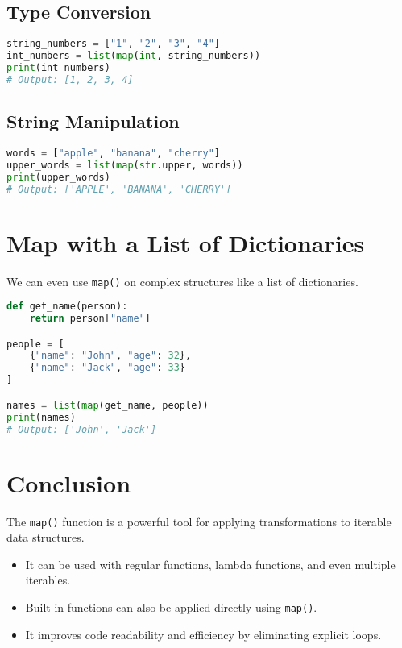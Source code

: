 \subsection{Type Conversion}
\begin{lstlisting}[language=Python, caption={Converting strings to integers}]
string_numbers = ["1", "2", "3", "4"]
int_numbers = list(map(int, string_numbers))
print(int_numbers)
# Output: [1, 2, 3, 4]
\end{lstlisting}

\subsection{String Manipulation}
\begin{lstlisting}[language=Python, caption={Converting words to uppercase}]
words = ["apple", "banana", "cherry"]
upper_words = list(map(str.upper, words))
print(upper_words)
# Output: ['APPLE', 'BANANA', 'CHERRY']
\end{lstlisting}

\section{Map with a List of Dictionaries}
We can even use \texttt{map()} on complex structures like a list of dictionaries.

\begin{lstlisting}[language=Python, caption={Extracting names from a list of dictionaries}]
def get_name(person):
    return person["name"]

people = [
    {"name": "John", "age": 32},
    {"name": "Jack", "age": 33}
]

names = list(map(get_name, people))
print(names)
# Output: ['John', 'Jack']
\end{lstlisting}

\section{Conclusion}
The \texttt{map()} function is a powerful tool for applying transformations to iterable data structures.  

\begin{itemize}
    \item It can be used with regular functions, lambda functions, and even multiple iterables.
    \item Built-in functions can also be applied directly using \texttt{map()}.
    \item It improves code readability and efficiency by eliminating explicit loops.
\end{itemize}

